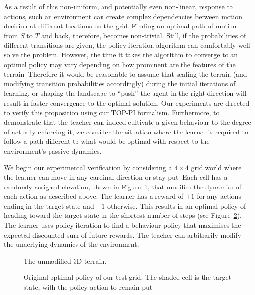 As a result of this non-uniform, and potentially even non-linear,
response to actions, such an environment can create complex
dependencies between motion decision at different locations on the
grid. Finding an optimal path of motion from $S$ to $T$ and back,
therefore, becomes non-trivial. Still, if the probabilities of
different transitions are given, the policy iteration algorithm can
comfortably well solve the problem. However, the time it takes the
algorithm to converge to an optimal policy may vary depending on how
prominent are the features of the terrain. Therefore it would be
reasonable to assume that scaling the terrain (and modifying
transition probabilities accordingly) during the initial iterations of
learning, or shaping the landscape to ``push'' the agent in the right
direction will result in faster convergence to the optimal
solution. Our experiments are directed to verify this proposition
using our TOP-PI formalism.  Furthermore, to demonstrate that the
teacher can indeed cultivate a given behaviour to the degree of actually 
enforcing it, we consider the situation where the learner is required
to follow a path different to what would be optimal with respect to
the environment's passive dynamics. %

We begin our experimental verification by considering a $4 \times 4$
grid world where the learner can move in any cardinal direction or
stay put.  Each cell has a randomly assigned elevation, shown in
Figure~\ref{probalt}, that modifies the dynamics of each action as
described above.  The learner has a reward of $+1$ for any actions
ending in the target state and $-1$ otherwise.  This results in an
optimal policy of heading toward the target state in the shortest
number of steps (see Figure~\ref{prevopt}).  The learner uses policy
iteration to find a behaviour policy that maximises the expected
discounted sum of future rewards. The teacher can arbitrarily modify
the underlying dynamics of the environment.

\begin{figure}[ht]
\centerline{}
\caption{\label{probalt}The unmodified 3D terrain.}
\end{figure}

\begin{figure}[ht]
\centerline{}
\caption{\label{prevopt}Original optimal policy of our test grid.  The shaded cell is the target state, with the policy action to remain put.}
\end{figure}


